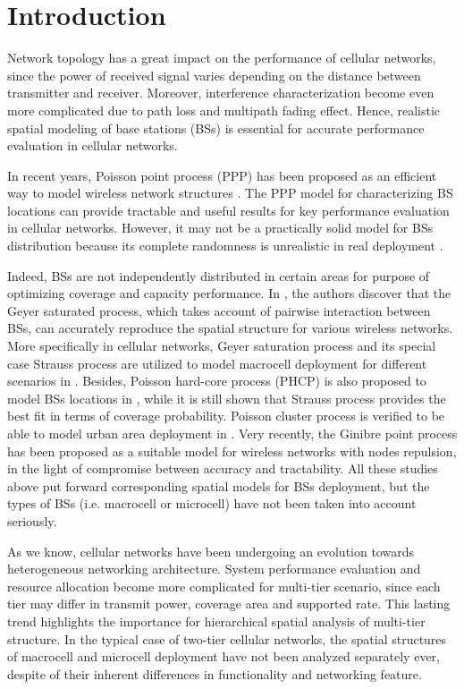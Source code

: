 \documentclass[conference]{IEEEtran}
\begin{document}
\section{Introduction}
Network topology has a great impact on the performance of cellular networks, since the power of received signal varies depending on the distance between transmitter and receiver. Moreover, interference characterization become even more complicated due to path loss and multipath fading effect\cite{andrews2010primer}. Hence, realistic spatial modeling of base stations (BSs) is essential for accurate performance evaluation in cellular networks.

In recent years, Poisson point process (PPP) has been proposed as an efficient way to model wireless network structures \cite{haenggi2009stochastic}. The PPP model for characterizing BS locations can provide tractable and useful results for key performance evaluation in cellular networks\cite{andrews2011tractable}. However, it may not be a practically solid model for BSs distribution because its complete randomness is unrealistic in real deployment \cite{riihijarvi2010modeling,taylor2012pairwise,guo2013spatial,lee2013stochastic,deng2014ginibre,wu2014spatial}.

Indeed, BSs are not independently distributed in certain areas for purpose of optimizing coverage and capacity performance. In \cite{riihijarvi2010modeling}, the authors discover that the Geyer saturated process, which takes account of pairwise interaction between BSs, can accurately reproduce the spatial structure for various wireless networks. More specifically in cellular networks, Geyer saturation process and its special case Strauss process are utilized to model macrocell deployment for different scenarios in \cite{taylor2012pairwise}. Besides, Poisson hard-core process (PHCP) is also proposed to model BSs locations in \cite{guo2013spatial}, while it is still shown that Strauss process provides the best fit in terms of coverage probability. Poisson cluster process is verified to be able to model urban area deployment in \cite{lee2013stochastic}. Very recently, the Ginibre point process has been proposed as a suitable model for wireless networks with nodes repulsion\cite{deng2014ginibre}, in the light of compromise between accuracy and tractability. All these studies above put forward corresponding spatial models for BSs deployment, but the types of BSs (i.e. macrocell or microcell) have not been taken into account seriously.

As we know, cellular networks have been undergoing an evolution towards heterogeneous networking architecture. System performance evaluation and resource allocation become more complicated for multi-tier scenario, since each tier may differ in transmit power, coverage area and supported rate\cite{dhillon2012modeling}\cite{cheung2012throughput}. This lasting trend highlights the importance for hierarchical spatial analysis of multi-tier structure. In the typical case of two-tier cellular networks, the spatial structures of macrocell and microcell deployment have not been analyzed separately ever, despite of their inherent differences in functionality and networking feature.
\end{document}

